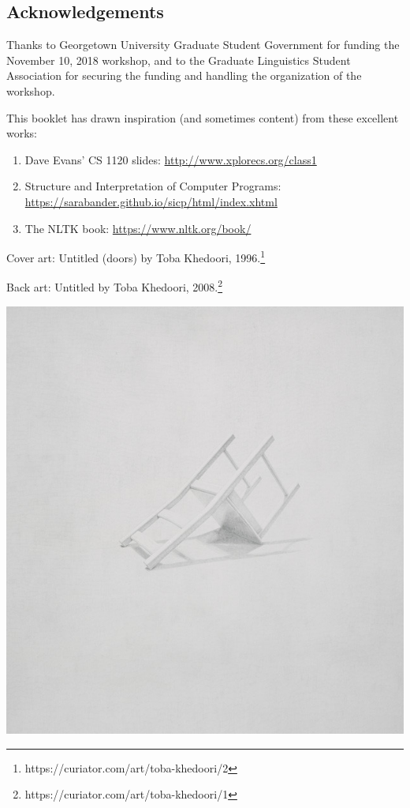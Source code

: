 \documentclass{article}
\let\oldsection\section
\renewcommand\section{\clearpage\oldsection}
\begin{document}
\subsection*{Acknowledgements}

Thanks to Georgetown University Graduate Student Government for funding the November 10, 2018 workshop, and to the Graduate Linguistics Student Association for securing the funding and handling the organization of the workshop. 

This booklet has drawn inspiration (and sometimes content) from these excellent works:

\begin{enumerate}
    \item Dave Evans'  CS 1120 slides: \url{http://www.xplorecs.org/class1}
    \item Structure and Interpretation of Computer Programs: \\ \url{https://sarabander.github.io/sicp/html/index.xhtml}
    \item The NLTK book: \url{https://www.nltk.org/book/}
\end{enumerate}

Cover art: Untitled (doors) by Toba Khedoori, 1996.\footnote{https://curiator.com/art/toba-khedoori/2}

Back art: Untitled by Toba Khedoori, 2008.\footnote{https://curiator.com/art/toba-khedoori/1}

\clearpage
{}

\vspace*{\fill}
\begin{center}
\includegraphics[scale=0.65]{chair.png}
\end{center}
\vspace*{\fill}
\end{document}
